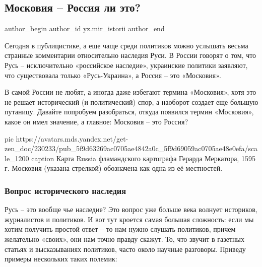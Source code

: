  
 
 
 
 
 
\subsection{Московия – Россия ли это?}
\label{sec:31_10_2020.sites.ru.zen_yandex.yz.mir_istorii.1.moskovia_rossia_li_eto}
\ifcmt
	author_begin
   author_id yz.mir_istorii
	author_end
\fi


Сегодня в публицистике, а еще чаще среди политиков можно услышать весьма
странные комментарии относительно наследия Руси. В России говорят о том, что
Русь – исключительно «российское наследие», украинские политики заявляют, что
существовала только «Русь-Украина», а Россия – это «Московия».

В самой России не любят, а иногда даже избегают термина «Московия», хотя это не
решает исторический (и политический) спор, а наоборот создает еще большую
путаницу. Давайте попробуем разобраться, откуда появился термин «Московия»,
какое он имел значение, а главное: Московия – это Россия?

\ifcmt
  pic https://avatars.mds.yandex.net/get-zen_doc/230233/pub_5f9d63269ac0705ae4842a0c_5f9d69059ac0705ae48e0efa/scale_1200
  caption Карта Russia фламандского картографа Герарда Меркатора, 1595 г. Московия (указана стрелкой) обозначена как одна из её местностей.
\fi

\subsubsection{Вопрос исторического наследия}

Русь – это вообще чье наследие? Это вопрос уже больше века волнует историков,
журналистов и политиков. И вот тут кроется самая большая сложность: если мы
хотим получить простой ответ – то нам нужно слушать политиков, причем
желательно «своих», они нам точно правду скажут. То, что звучит в газетных
статьях и высказываниях политиков, часто около научные разговоры. Приведу
примеры нескольких таких полемик:

